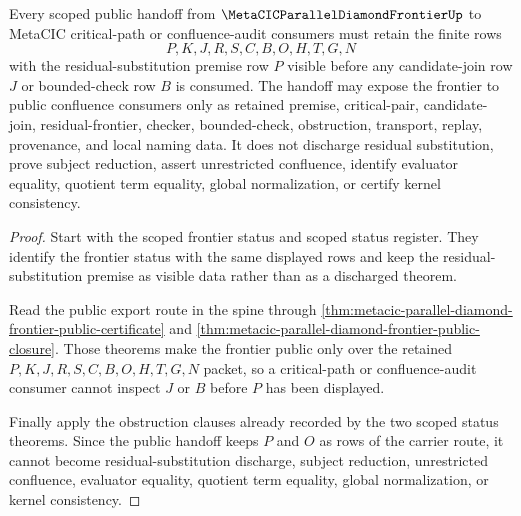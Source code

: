 \begin{theorem}
\label{thm:metacic-parallel-diamond-frontier-scoped-route-handoff}
Every scoped public handoff from $\MetaCICParallelDiamondFrontierUp$ to MetaCIC critical-path or confluence-audit consumers must retain the finite rows
$$
P,K,J,R,S,C,B,O,H,T,G,N
$$
with the residual-substitution premise row $P$ visible before any candidate-join row $J$ or bounded-check row $B$ is consumed. The handoff may expose the frontier to public confluence consumers only as retained premise, critical-pair, candidate-join, residual-frontier, checker, bounded-check, obstruction, transport, replay, provenance, and local naming data. It does not discharge residual substitution, prove subject reduction, assert unrestricted confluence, identify evaluator equality, quotient term equality, global normalization, or certify kernel consistency.
\end{theorem}
\begin{proof}
Start with the scoped frontier status and scoped status register. They identify the frontier status with the same displayed rows and keep the residual-substitution premise as visible data rather than as a discharged theorem.

Read the public export route in the spine through \autoref{thm:metacic-parallel-diamond-frontier-public-certificate} and \autoref{thm:metacic-parallel-diamond-frontier-public-closure}. Those theorems make the frontier public only over the retained $P,K,J,R,S,C,B,O,H,T,G,N$ packet, so a critical-path or confluence-audit consumer cannot inspect $J$ or $B$ before $P$ has been displayed.

Finally apply the obstruction clauses already recorded by the two scoped status theorems. Since the public handoff keeps $P$ and $O$ as rows of the carrier route, it cannot become residual-substitution discharge, subject reduction, unrestricted confluence, evaluator equality, quotient term equality, global normalization, or kernel consistency.
\end{proof}
